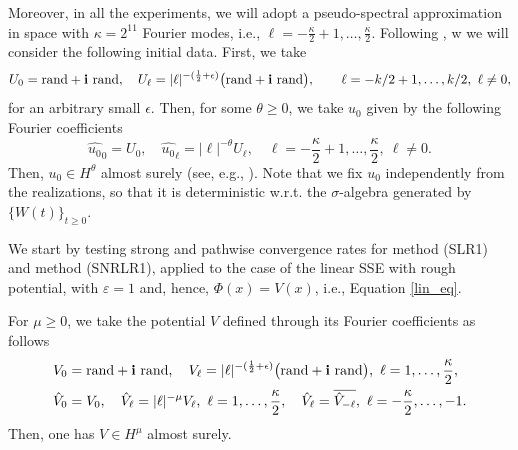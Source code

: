 \documentclass[a4paper]{amsart}
\begin{document}
Moreover, in all the experiments, we will adopt a pseudo-spectral approximation in space with $\kappa=2^{11}$ Fourier modes, i.e., $\ell= -\frac{\kappa}{2}+1,\dots,\frac{\kappa}{2}$. Following \cite{os_ka,fe_ka}, w we will consider the following initial data. First, we take 
$$
U_0={\rm rand} +{\bf i} \ {\rm rand}, \quad U_\ell=|\ell|^{-(\frac{1}{2}+\epsilon)}\big({\rm rand}+{\bf i} \ {\rm rand}\big), \qquad \ell=-k/2+1,\dots,k/2, \ \ell\ne 0,
$$
for an arbitrary small $\epsilon$. Then, for some $\theta\ge 0$, we take $u_0$ given by the following Fourier coefficients 
$$
\hat{u_0}_{0}=U_0, \quad \hat{u_0}_{\ell} = |\ell|^{-\theta} U_\ell, \quad \ell=-\frac{\kappa}{2}+1,\dots,\frac{\kappa}{2}, \ \ell\ne 0.
$$
Then, $u_0 \in H^\theta$ almost surely (see, e.g., \cite{fe_ka}). Note that we fix $u_0$ independently from the realizations, so that it is deterministic w.r.t. the $\sigma$-algebra generated by $\{W(t)\}_{t\ge 0}$.


We start by testing strong and pathwise convergence rates for method (SLR1) and method (SNRLR1), applied to the case of the linear SSE with rough potential, with $\varepsilon=1$ and, hence, $\Phi(x)=V(x)$, i.e., Equation \eqref{lin_eq}.

For $\mu\ge 0$, we take the potential $V$ defined through its Fourier coefficients as follows
\begin{align*}
  &  V_0={\rm rand}+{\bf i}\ {\rm rand}, \quad V_{\ell}=|\ell|^{-(\frac{1}{2}+\epsilon)}\big({\rm rand}+{\bf i}\ {\rm rand}\big), \ \ell=1,\dots,\frac{\kappa}{2},\\
  &  \hat{V}_{0}=V_{0}, \quad \hat{V}_{\ell}=|\ell|^{-\mu} V_{\ell}, \ \ell=1,\dots,\frac{\kappa}{2},
  \quad \hat{V}_{\ell}=\overline{\hat{V}_{-\ell}}, \ \ell=-\frac{\kappa}{2},\dots,-1.
\end{align*}
Then, one has $V\in H^\mu$ almost surely.
\end{document}
